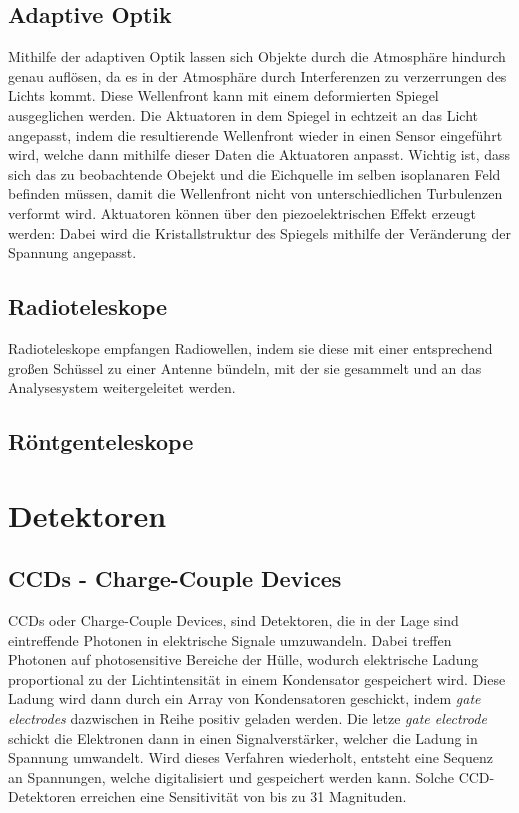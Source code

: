 \documentclass[a4paper,12pt]{article}
\begin{document}
\subsection{Adaptive Optik}
Mithilfe der adaptiven Optik lassen sich Objekte durch die Atmosphäre hindurch genau auflösen, da es in der Atmosphäre durch Interferenzen zu verzerrungen des Lichts kommt. Diese Wellenfront kann mit einem deformierten Spiegel ausgeglichen werden. Die Aktuatoren in dem Spiegel in echtzeit an das Licht angepasst, indem die resultierende Wellenfront wieder in einen Sensor eingeführt wird, welche dann mithilfe dieser Daten die Aktuatoren anpasst. Wichtig ist, dass sich das zu beobachtende Obejekt und die Eichquelle im selben isoplanaren Feld befinden müssen, damit die Wellenfront nicht von unterschiedlichen Turbulenzen verformt wird. Aktuatoren können über den piezoelektrischen Effekt erzeugt werden: Dabei wird die Kristallstruktur des Spiegels mithilfe der Veränderung der Spannung angepasst. 

\subsection{Radioteleskope}
Radioteleskope empfangen Radiowellen, indem sie diese mit einer entsprechend großen Schüssel zu einer Antenne bündeln, mit der sie gesammelt und an das Analysesystem weitergeleitet werden.

\subsection{Röntgenteleskope}

\section{Detektoren}
\subsection{CCDs - Charge-Couple Devices}
CCDs oder Charge-Couple Devices, sind Detektoren, die in der Lage sind eintreffende Photonen in elektrische Signale umzuwandeln. Dabei treffen Photonen auf photosensitive Bereiche der Hülle, wodurch elektrische Ladung proportional zu der Lichtintensität in einem Kondensator gespeichert wird. Diese Ladung wird dann durch ein Array von Kondensatoren geschickt, indem \textit{gate electrodes} dazwischen in Reihe positiv geladen werden. Die letze \textit{gate electrode} schickt die Elektronen dann in einen Signalverstärker, welcher die Ladung in Spannung umwandelt. Wird dieses Verfahren wiederholt, entsteht eine Sequenz an Spannungen, welche digitalisiert und gespeichert werden kann. Solche CCD-Detektoren erreichen eine Sensitivität von bis zu 31 Magnituden.
\end{document}
